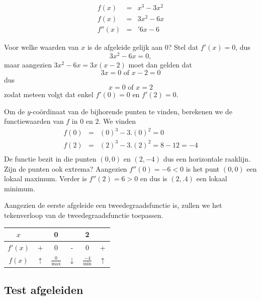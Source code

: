 \begin{voorbeeld}
	\begin{eqnarray*}
	f(x) & =& x^3-3x^2 \\
	f(x) & =& 3x^2-6x \\
	f''(x) & =& '6x-6 
	\end{eqnarray*}


\begin{center}
	
\end{center}

%


	Voor welke waarden van $x$ is de afgeleide gelijk aan 0? Stel dat $f'(x)=0$, dus
	\begin{equation*}
	3x^2-6x=0,
	\end{equation*}
	maar aangezien $3x^2-6x=3x(x-2)$ moet dan gelden dat
	\begin{equation*}
	3x =0 \text{ of } x-2=0
	\end{equation*}
	dus
	\begin{equation*}
	x=0 \text{ of } x=2
	\end{equation*}
	zodat meteen volgt dat enkel $f'(0)=0$ en $f'(2)=0$.
	
	Om de $y$-co\"ordinaat van de bijhorende punten te vinden, berekenen we de functiewaarden van $f$ in $0$ en $2$. We vinden
	\begin{eqnarray*}
		f(0)&=&(0)^3-3.(0)^2= 0 \\
		f(2)&=&(2)^3-3.(2)^2= 8-12=-4 \\
	\end{eqnarray*}
	De functie bezit in die punten $(0,0)$ en $(2,-4)$ dus een horizontale raaklijn. Zijn de punten ook extrema? 
	Aangezien $f''(0)=-6<0$ is het punt $(0,0)$ een lokaal maximum. Verder is $f''(2)=6>0$ en dus is $(2,.4)$ een lokaal minimum.
	
	Aangezien de eerste afgeleide een tweedegraadsfunctie is, zullen we het tekenverloop van de tweedegraadsfunctie toepassen.
	
	\begin{center}
		\begin{tabular}{c|ccccc}
			$x$ & & 0 & & 2 & \\
			\hline 
			$f'(x)$ & + & 0 & - & 0 & + \\
			\hline
			$f(x)$ & $\uparrow$  & $\frac{0}{\text{max}}$ & $\downarrow$ & $\frac{-4}{\text{min}}$ & $\uparrow$
		\end{tabular}
	\end{center}


\end{voorbeeld}

\subsection{Test afgeleiden}





